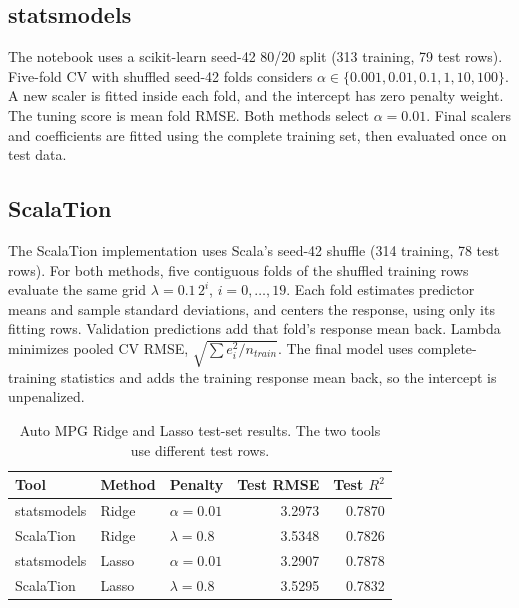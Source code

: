 \documentclass{article}
\begin{document}
\subsection{statsmodels}

The notebook uses a scikit-learn seed-42 80/20 split (313 training, 79 test rows). Five-fold CV with shuffled seed-42 folds considers $\alpha\in\{0.001,0.01,0.1,1,10,100\}$. A new scaler is fitted inside each fold, and the intercept has zero penalty weight. The tuning score is mean fold RMSE. Both methods select $\alpha=0.01$. Final scalers and coefficients are fitted using the complete training set, then evaluated once on test data.

\subsection{ScalaTion}

The ScalaTion implementation uses Scala's seed-42 shuffle (314 training, 78 test rows). For both methods, five contiguous folds of the shuffled training rows evaluate the same grid $\lambda=0.1\,2^i$, $i=0,\ldots,19$. Each fold estimates predictor means and sample standard deviations, and centers the response, using only its fitting rows. Validation predictions add that fold's response mean back. Lambda minimizes pooled CV RMSE, $\sqrt{\sum e_i^2/n_{train}}$. The final model uses complete-training statistics and adds the training response mean back, so the intercept is unpenalized.

\begin{table}[H]
\centering\small
\caption{Auto MPG Ridge and Lasso test-set results. The two tools use different test rows.}
\label{tab:regularized-results}
\begin{tabular}{lllrr}
\toprule
Tool & Method & Penalty & Test RMSE & Test $R^2$ \\
\midrule
statsmodels & Ridge & $\alpha=0.01$ & 3.2973 & 0.7870 \\
ScalaTion & Ridge & $\lambda=0.8$ & 3.5348 & 0.7826 \\
statsmodels & Lasso & $\alpha=0.01$ & 3.2907 & 0.7878 \\
ScalaTion & Lasso & $\lambda=0.8$ & 3.5295 & 0.7832 \\
\bottomrule
\end{tabular}
\end{table}
\end{document}
